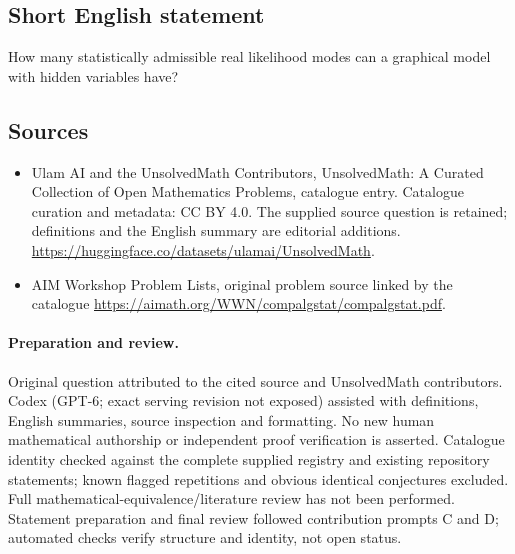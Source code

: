 \documentclass[11pt]{article}
\begin{document}
\subsection{Short English statement}
How many statistically admissible real likelihood modes can a graphical model with hidden variables have?
\subsection{Sources}
\begin{itemize}
\item[\hypertarget{source:statement:1}{S1}] Ulam AI and the UnsolvedMath Contributors, UnsolvedMath: A Curated Collection of Open Mathematics Problems, catalogue entry. Catalogue curation and metadata: CC BY 4.0. The supplied source question is retained; definitions and the English summary are editorial additions.
\url{https://huggingface.co/datasets/ulamai/UnsolvedMath}.
\item[\hypertarget{source:statement:2}{S2}] AIM Workshop Problem Lists, original problem source linked by the catalogue
\url{https://aimath.org/WWN/compalgstat/compalgstat.pdf}.
\end{itemize}
\paragraph{Preparation and review.}
Original question attributed to the cited source and UnsolvedMath contributors. Codex (GPT-6; exact serving revision not exposed) assisted with definitions, English summaries, source inspection and formatting. No new human mathematical authorship or independent proof verification is asserted. Catalogue identity checked against the complete supplied registry and existing repository statements; known flagged repetitions and obvious identical conjectures excluded. Full mathematical-equivalence/literature review has not been performed. Statement preparation and final review followed contribution prompts C and D; automated checks verify structure and identity, not open status.
\label{end:statement}
\end{document}
